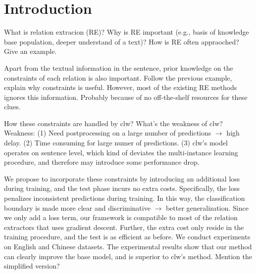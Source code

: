 \section{Introduction}

What is relation extracion (RE)?
Why is RE important (e.g., basis of knowledge base population, deeper understand of a text)?
How is RE often appraoched? Give an example.


Apart from the textual information in the sentence, prior knowledge on the constraints of each relation is also important.
Follow the previous example, explain why constraints is useful.
However, most of the existing RE methods ignores this information.
Probably because of no off-the-shelf resources for these clues.

How these constraints are handled by clw?
What's the weakness of clw? 
Weakness: 
(1) Need postprocessing on a large number of predictions $\rightarrow$ high delay.
(2) Time consuming for large numer of predictions.
(3) clw's model operates on sentence level, which kind of deviates the multi-instance learning procedure, and therefore may introduce some performance drop.

We propose to incorporate these constraints by introducing an additional loss during training, and the test phase incurs no extra costs.
Specifically, the loss penalizes inconsistent predictions during training.
In this way, the classification boundary is made more clear and discriminative $\rightarrow$ better generalization.
Since we only add a loss term, our framework is compatible to most of the relation extractors that uses gradient descent.
Further, the extra cost only reside in the training procedure, and the test is as efficient as before.
We conduct experiments on English and Chinese datasets.
The experimental results show that our method can clearly improve the base model, and is superior to clw's method.
Mention the simplified version?

